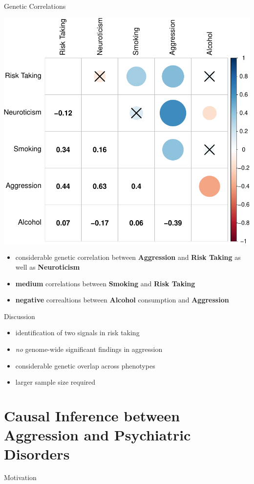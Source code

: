 \documentclass{beamer}
\begin{document}
\begin{frame}[t]{Genetic Correlations}
  \tiny
  \begin{center}
    \includegraphics[width=0.6\linewidth]{../ukb_assoc/figure/genetic_corr/gcorr_plot_circle_full_se.pdf}
  \end{center}
  \begin{itemize}
    \item considerable genetic correlation between \textbf{Aggression} and \textbf{Risk Taking} as well as \textbf{Neuroticism}
    \item \textbf{medium} correlations between \textbf{Smoking} and \textbf{Risk Taking}
    \item \textbf{negative} correaltions between \textbf{Alcohol} consumption and \textbf{Aggression}
  \end{itemize}
\end{frame}

\begin{frame}[t]{Discussion}
  \begin{itemize}
    \item identification of two signals in risk taking
    \item \textit{no} genome-wide significant findings in aggression
    \item considerable genetic overlap across phenotypes
    \item larger sample size required
  \end{itemize} 
\end{frame}

\section{Causal Inference between Aggression and Psychiatric Disorders}

\begin{frame}[t]{Motivation}

\end{frame}
\end{document}
